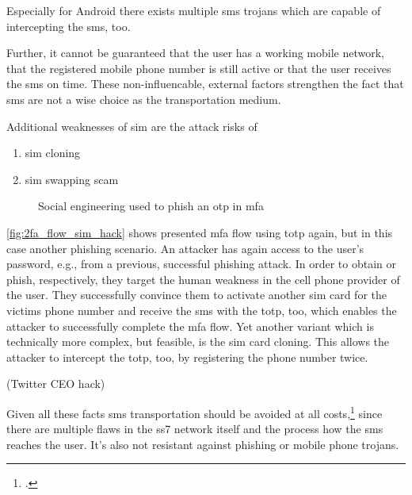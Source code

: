 Especially for Android there exists multiple \gls{sms} trojans which are capable of intercepting the \gls{sms}, too.

Further, it cannot be guaranteed that the user has a working mobile network, that the registered mobile phone number is still active or that the user receives the \gls{sms} on time. These non-influencable, external factors strengthen the fact that \gls{sms} are not a wise choice as the transportation medium.

Additional weaknesses of \gls{sim} are the attack risks of 

\begin{enumerate}[label=(\alph*)]
	\item \gls{sim} cloning
	\item \gls{sim} swapping scam
\end{enumerate}

\begin{figure}[hbt]
	\centering
	
	\caption[Social engineering used to phish an \gls{otp} in \gls{mfa}]{Social engineering used to phish an \gls{otp} in \gls{mfa}\footnotemark}
	\label{fig:2fa_flow_sim_hack}
\end{figure}

\autoref{fig:2fa_flow_sim_hack} shows presented \gls{mfa} flow using \gls{totp} again, but in this case another phishing scenario. An attacker has again access to the user's password, e.g., from a previous, successful phishing attack. In order to obtain or phish, respectively, they target the human weakness in the cell phone provider of the user. They successfully convince them to activate another \gls{sim} card for the victims phone number and receive the \gls{sms} with the \gls{totp}, too, which enables the attacker to successfully complete the \gls{mfa} flow. Yet another variant which is technically more complex, but feasible, is the \gls{sim} card cloning. This allows the attacker to intercept the \gls{totp}, too, by registering the phone number twice.

\cite{FIPS198} \cite{SP80063B} (Twitter CEO hack) \cite{twitter-hack}

Given all these facts \gls{sms} transportation should be avoided at all costs,\footcite{JAKOBSSON20186} since there are multiple flaws in the \gls{ss7} network itself and the process how the \gls{sms} reaches the user. It's also not resistant against phishing or mobile phone trojans.

